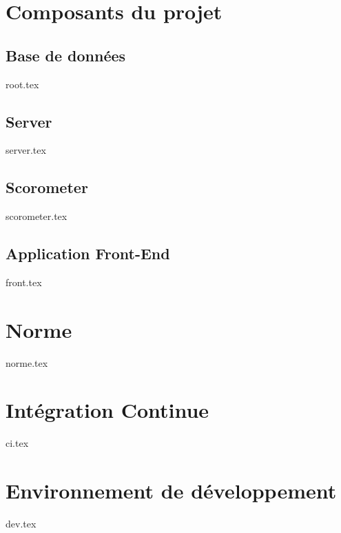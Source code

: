 \documentclass[a4paper, 12pt]{article}
\def\dir{tech_documentation}
\begin{document}
\section{Composants du projet}

\subsection{Base de données}
{root.tex}

\subsection{Server}
{server.tex}

\subsection{Scorometer}
{scorometer.tex}

\subsection{Application Front-End}
{front.tex}

\section{Norme}
{norme.tex}

\section{Intégration Continue}
{ci.tex}

\section{Environnement de développement}
{dev.tex}
\end{document}
